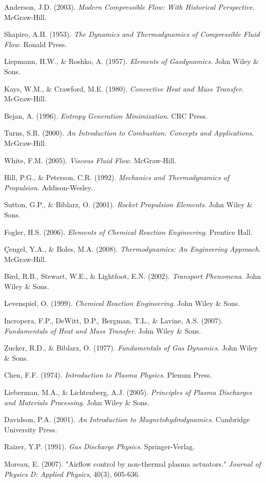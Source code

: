 \documentclass[12pt,a4paper]{article}
\begin{document}
\begin{thebibliography}{20}

Anderson, J.D. (2003). \emph{Modern Compressible Flow: With Historical Perspective}. McGraw-Hill.

Shapiro, A.H. (1953). \emph{The Dynamics and Thermodynamics of Compressible Fluid Flow}. Ronald Press.

Liepmann, H.W., \& Roshko, A. (1957). \emph{Elements of Gasdynamics}. John Wiley \& Sons.

Kays, W.M., \& Crawford, M.E. (1980). \emph{Convective Heat and Mass Transfer}. McGraw-Hill.

Bejan, A. (1996). \emph{Entropy Generation Minimization}. CRC Press.

Turns, S.R. (2000). \emph{An Introduction to Combustion: Concepts and Applications}. McGraw-Hill.

White, F.M. (2005). \emph{Viscous Fluid Flow}. McGraw-Hill.

Hill, P.G., \& Peterson, C.R. (1992). \emph{Mechanics and Thermodynamics of Propulsion}. Addison-Wesley.

Sutton, G.P., \& Biblarz, O. (2001). \emph{Rocket Propulsion Elements}. John Wiley \& Sons.

Fogler, H.S. (2006). \emph{Elements of Chemical Reaction Engineering}. Prentice Hall.

Çengel, Y.A., \& Boles, M.A. (2008). \emph{Thermodynamics: An Engineering Approach}. McGraw-Hill.

Bird, R.B., Stewart, W.E., \& Lightfoot, E.N. (2002). \emph{Transport Phenomena}. John Wiley \& Sons.

Levenspiel, O. (1999). \emph{Chemical Reaction Engineering}. John Wiley \& Sons.

Incropera, F.P., DeWitt, D.P., Bergman, T.L., \& Lavine, A.S. (2007). \emph{Fundamentals of Heat and Mass Transfer}. John Wiley \& Sons.

Zucker, R.D., \& Biblarz, O. (1977). \emph{Fundamentals of Gas Dynamics}. John Wiley \& Sons.

Chen, F.F. (1974). \emph{Introduction to Plasma Physics}. Plenum Press.

Lieberman, M.A., \& Lichtenberg, A.J. (2005). \emph{Principles of Plasma Discharges and Materials Processing}. John Wiley \& Sons.

Davidson, P.A. (2001). \emph{An Introduction to Magnetohydrodynamics}. Cambridge University Press.

Raizer, Y.P. (1991). \emph{Gas Discharge Physics}. Springer-Verlag.

Moreau, E. (2007). "Airflow control by non-thermal plasma actuators." \emph{Journal of Physics D: Applied Physics}, 40(3), 605-636.

\end{thebibliography}
\end{document}
